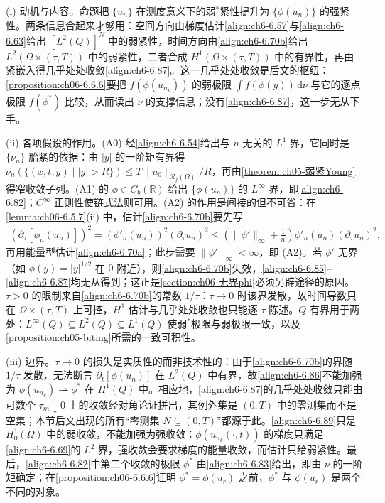 \documentclass[../../main.tex]{subfiles}%
\begin{document}
\begin{remark}\label{remark:ch06-6.6.2}
(i) 动机与内容。命题把 $\{u_n\}$ 在测度意义下的弱$^*$紧性提升为 $\{\phi(u_n)\}$ 的强紧性。两条信息合起来才够用：空间方向由梯度估计\eqref{align:ch6-6.57}与\eqref{align:ch6-6.63}给出 $[L^2(Q)]^N$ 中的弱紧性，时间方向由\eqref{align:ch6-6.70b}给出 $L^2(\Omega\times(\tau,T))$ 中的弱紧性，二者合成 $H^1(\Omega\times(\tau,T))$ 中的有界性，再由紧嵌入得几乎处处收敛\eqref{align:ch6-6.87}。这一几乎处处收敛是后文的枢纽：\cref{proposition:ch06-6.6.6}要把 $f(\phi(u_{n_k}))$ 的弱极限 $\int f(\phi(y))\,\mathrm{d}\nu$ 与它的逐点极限 $f(\phi^*)$ 比较，从而读出 $\nu$ 的支撑信息；没有\eqref{align:ch6-6.87}，这一步无从下手。

(ii) 各项假设的作用。(A0) 经\eqref{align:ch6-6.54}给出与 $n$ 无关的 $L^1$ 界，它同时是 $\{\nu_n\}$ 胎紧的依据：由 $|y|$ 的一阶矩有界得 $\nu_n(\{(x,t,y)\mid|y|>R\})\leqslant T\|u_0\|_{\mathscr{R}_f(\Omega)}/R$，再由\cref{theorem:ch05-弱紧Young}得窄收敛子列。(A1) 的 $\phi\in C_b(\mathbb{R})$ 给出 $\{\phi(u_n)\}$ 的 $L^\infty$ 界，即\eqref{align:ch6-6.82}；$C^\infty$ 正则性使链式法则可用。(A2) 的作用是间接的但不可省：在\cref{lemma:ch06-6.5.7}(ii) 中，估计\eqref{align:ch6-6.70b}要先写
\begin{align*}
(\partial_\tau[\phi_n(u_n)])^2=(\phi'_n(u_n))^2(\partial_\tau u_n)^2
\leqslant\left(\|\phi'\|_\infty+\frac{1}{n}\right)\phi'_n(u_n)(\partial_\tau u_n)^2,
\end{align*}
再用能量型估计\eqref{align:ch6-6.70a}；此步需要 $\|\phi'\|_\infty<\infty$，即 (A2)。若 $\phi'$ 无界（如 $\phi(y)=|y|^{1/2}$ 在 $0$ 附近），则\eqref{align:ch6-6.70b}失效，\eqref{align:ch6-6.85}--\eqref{align:ch6-6.87}均无从得到；这正是\cref{section:ch06-无界phi}必须另辟途径的原因。$\tau>0$ 的限制来自\eqref{align:ch6-6.70b}的常数 $1/\tau$：$\tau\to0$ 时该界发散，故时间导数只在 $\Omega\times(\tau,T)$ 上可控，$H^1$ 估计与几乎处处收敛也只能逐 $\tau$ 陈述。$Q$ 有界用于两处：$L^\infty(Q)\subseteq L^2(Q)\subseteq L^1(Q)$ 使弱$^*$极限与弱极限一致，以及\cref{proposition:ch05-biting}所需的一致可积性。

(iii) 边界。$\tau\to0$ 的损失是实质性的而非技术性的：由于\eqref{align:ch6-6.70b}的界随 $1/\tau$ 发散，无法断言 $\partial_t[\phi(u_n)]$ 在 $L^2(Q)$ 中有界，故\eqref{align:ch6-6.86}不能加强为 $\phi(u_{n_k})\rightharpoonup\phi^*$ 在 $H^1(Q)$ 中。相应地，\eqref{align:ch6-6.87}的几乎处处收敛只能由可数个 $\tau_m\downarrow0$ 上的收敛经对角论证拼出，其例外集是 $(0,T)$ 中的零测集而不是空集；本节后文出现的所有“零测集 $N\subseteq(0,T)$”都源于此。\eqref{align:ch6-6.89}只是 $H^1_0(\Omega)$ 中的弱收敛，不能加强为强收敛：$\phi(u_{n_k}(\cdot,t))$ 的梯度只满足\eqref{align:ch6-6.69}的 $L^2$ 界，强收敛会要求梯度的能量收敛，而估计只给弱紧性。最后，\eqref{align:ch6-6.82}中第二个收敛的极限 $\phi^*$ 由\eqref{align:ch6-6.83}给出，即由 $\nu$ 的一阶矩确定；在\cref{proposition:ch06-6.6.6}证明 $\phi^*=\phi(u_r)$ 之前，$\phi^*$ 与 $\phi(u_r)$ 是两个不同的对象。
\end{remark}
\end{document}

